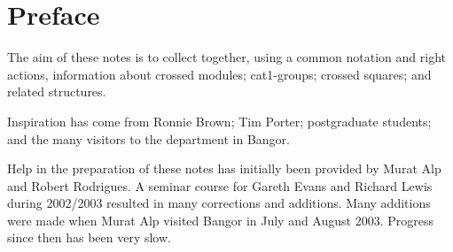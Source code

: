 
\section*{Preface}


The aim of these notes is to collect together, using a common notation
and right actions, information about crossed modules; cat1-groups;
crossed squares; and related structures.

Inspiration has come from Ronnie Brown; Tim Porter; postgraduate students;
and the many visitors to the department in Bangor.

Help in the preparation of these notes has initially been 
provided by Murat Alp and Robert Rodrigues.
A seminar course for Gareth Evans and Richard Lewis during 2002/2003 
resulted in many corrections and additions.
Many additions were made when Murat Alp visited Bangor in July and August 2003.
Progress since then has been very slow.

